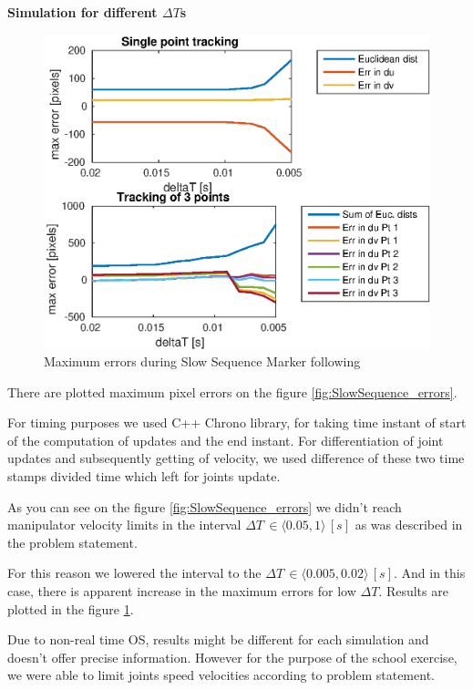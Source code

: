 \documentclass[]{scrartcl}
\begin{document}
\vspace{0.5cm}
\textbf{Simulation for different $\Delta T$s} \\
\begin{figure}
	\centering
	\includegraphics[width=0.7\linewidth]{fig/SlowSequence_low_dTs_errors.eps}
	\caption{Maximum errors during Slow Sequence Marker following}
	\label{fig:SlowSequence_low_dTs_errors}
\end{figure}

There are plotted maximum pixel errors on the figure \ref{fig:SlowSequence_errors}.

For timing purposes we used C++ Chrono library, for taking time instant of start of the computation of updates and the end instant. For differentiation of joint updates and subsequently getting of velocity, we used difference of these two time stamps divided time which left for joints update. 

As you can see on the figure \ref{fig:SlowSequence_errors} we didn't reach manipulator velocity limits in the interval $\Delta T \, \in \langle0.05, 1\rangle \, [s]$ as was described in the problem statement.

For this reason we lowered the interval to the $\Delta T \, \in \langle0.005, 0.02\rangle \, [s]$. And in this case, there is apparent increase in the maximum errors for low $\Delta T$. Results are plotted in the figure \ref{fig:SlowSequence_low_dTs_errors}.

Due to non-real time OS, results might be different for each simulation and doesn't offer precise information. However for the purpose of the school exercise, we were able to limit joints speed velocities according to problem statement.
\end{document}
